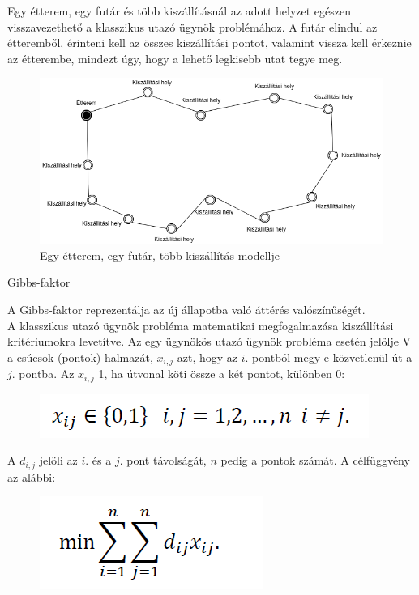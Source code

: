

Egy étterem, egy futár és több kiszállításnál az adott helyzet egészen visszavezethető a klasszikus utazó ügynök problémához.
A futár elindul az étteremből, érinteni kell az összes kiszállítási pontot, valamint vissza kell érkeznie az étterembe, mindezt úgy, hogy a lehető legkisebb utat tegye meg.

\begin{figure}[h!]
\centering
\includegraphics[scale=0.5]{images/Simpletsp.png}
\caption{Egy étterem, egy futár, több kiszállítás modellje}
\label{fig:model2}
\end{figure}


Gibbs-faktor

A Gibbs-faktor reprezentálja az új állapotba való áttérés valószínűségét.\\

A klasszikus utazó ügynök probléma matematikai megfogalmazása kiszállítási kritériumokra levetítve.
Az egy ügynökös utazó ügynök probléma esetén jelölje V a csúcsok (pontok) halmazát, $x_{i,j}$ azt, hogy az $i.$ pontból megy-e közvetlenül út a $j.$ pontba. Az $x_{i,j}$ 1, ha útvonal köti össze a két pontot, különben 0:
\begin{figure}[h!]
\centering
\includegraphics[scale=0.5]{images/1tsp.png}
\end{figure}

A $d_{i,j}$ jelöli az $i.$ és a $j.$ pont távolságát, $n$ pedig a pontok számát. A célfüggvény az alábbi:
\begin{figure}[h!]
\centering
\includegraphics[scale=0.5]{images/2tsp.png}
\end{figure}

